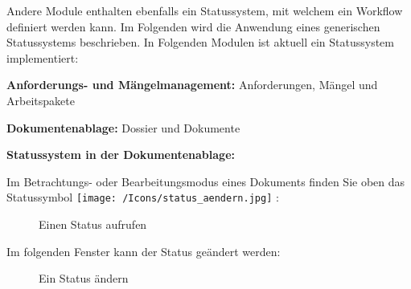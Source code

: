Andere Module enthalten ebenfalls ein Statussystem, mit welchem ein Workflow definiert werden kann. Im Folgenden wird die Anwendung eines generischen Statussystems beschrieben. In Folgenden Modulen ist aktuell ein Statussystem implementiert:

\vspace{\baselineskip}

\begin{compactitem}
	\item \textbf{Anforderungs- und Mängelmanagement:} Anforderungen, Mängel und Arbeitspakete
	\item \textbf{Dokumentenablage:} Dossier und Dokumente
\end{compactitem}

\vspace{\baselineskip}

\textbf{Statussystem in der Dokumentenablage:}

\vspace{\baselineskip}

Im Betrachtungs- oder Bearbeitungsmodus eines Dokuments finden Sie oben das Statussymbol \texttt{[image: /Icons/status\_aendern.jpg]} : 

\begin{figure}[H]
\caption{Einen Status aufrufen}
\end{figure}

Im folgenden Fenster kann der Status geändert werden:

\begin{figure}[H]
\caption{Ein Status ändern}
\end{figure}

